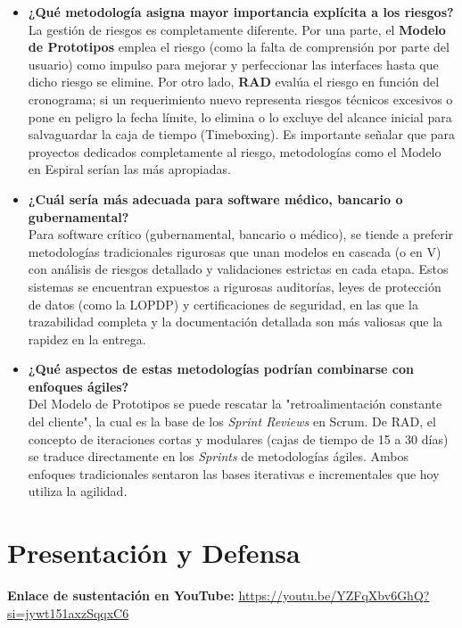 \documentclass[pdflatex,sn-mathphys-num]{sn-jnl}%
\theoremstyle{thmstyleone}%
\theoremstyle{thmstyletwo}%
\theoremstyle{thmstylethree}%
\begin{document}
\begin{itemize}
 	\item \textbf{¿Qué metodología asigna mayor importancia explícita a los riesgos?}\\
 	La gestión de riesgos es completamente diferente. Por una parte, el \textbf{Modelo de Prototipos} emplea el riesgo (como la falta de comprensión por parte del usuario) como impulso para mejorar y perfeccionar las interfaces hasta que dicho riesgo se elimine. Por otro lado, \textbf{RAD} evalúa el riesgo en función del cronograma; si un requerimiento nuevo representa riesgos técnicos excesivos o pone en peligro la fecha límite, lo elimina o lo excluye del alcance inicial para salvaguardar la caja de tiempo (Timeboxing). Es importante señalar que para proyectos dedicados completamente al riesgo, metodologías como el Modelo en Espiral serían las más apropiadas.
 	\item \textbf{¿Cuál sería más adecuada para software médico, bancario o gubernamental?}\\
Para software crítico (gubernamental, bancario o médico), se tiende a preferir metodologías tradicionales rigurosas que unan modelos en cascada (o en V) con análisis de riesgos detallado y validaciones estrictas en cada etapa. Estos sistemas se encuentran expuestos a rigurosas auditorías, leyes de protección de datos (como la LOPDP) y certificaciones de seguridad, en las que la trazabilidad completa y la documentación detallada son más valiosas que la rapidez en la entrega.
 	\item \textbf{¿Qué aspectos de estas metodologías podrían combinarse con enfoques ágiles?}\\
 	Del Modelo de Prototipos se puede rescatar la "retroalimentación constante del cliente", la cual es la base de los \textit{Sprint Reviews} en Scrum. De RAD, el concepto de iteraciones cortas y modulares (cajas de tiempo de 15 a 30 días) se traduce directamente en los \textit{Sprints} de metodologías ágiles. Ambos enfoques tradicionales sentaron las bases iterativas e incrementales que hoy utiliza la agilidad.
 \end{itemize}
 \section{Presentación y Defensa}\label{sec:defensa}
 \textbf{Enlace de sustentación en YouTube:} \url{https://youtu.be/YZFqXbv6GhQ?si=jywt151axzSqqxC6}
 
\end{document}
